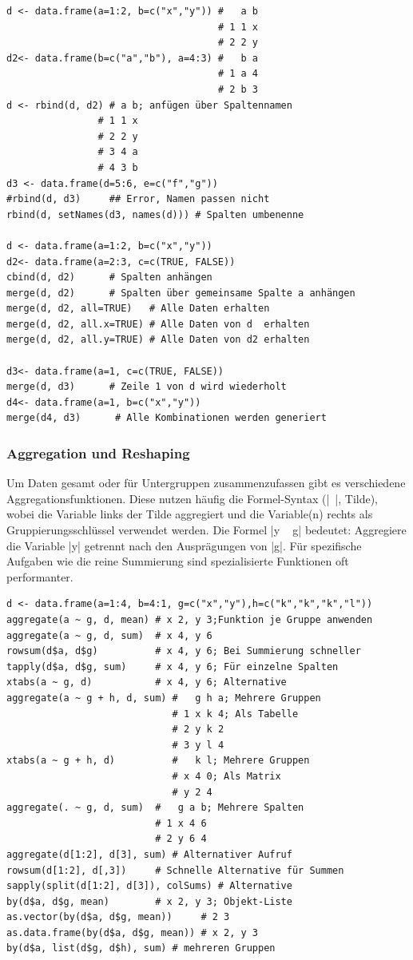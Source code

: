 \documentclass[10pt,twocolumn]{scrartcl}
\renewcommand{\lstinline}{\mycoloredinline}
\begin{document}
\begin{lstlisting}
d <- data.frame(a=1:2, b=c("x","y")) #   a b
                                     # 1 1 x
                                     # 2 2 y
d2<- data.frame(b=c("a","b"), a=4:3) #   b a
                                     # 1 a 4
                                     # 2 b 3
d <- rbind(d, d2) # a b; anfügen über Spaltennamen
                # 1 1 x
                # 2 2 y
                # 3 4 a
                # 4 3 b
d3 <- data.frame(d=5:6, e=c("f","g"))
#rbind(d, d3)     ## Error, Namen passen nicht
rbind(d, setNames(d3, names(d))) # Spalten umbenenne

d <- data.frame(a=1:2, b=c("x","y"))
d2<- data.frame(a=2:3, c=c(TRUE, FALSE))
cbind(d, d2)      # Spalten anhängen
merge(d, d2)      # Spalten über gemeinsame Spalte a anhängen
merge(d, d2, all=TRUE)   # Alle Daten erhalten
merge(d, d2, all.x=TRUE) # Alle Daten von d  erhalten
merge(d, d2, all.y=TRUE) # Alle Daten von d2 erhalten

d3<- data.frame(a=1, c=c(TRUE, FALSE))
merge(d, d3)      # Zeile 1 von d wird wiederholt
d4<- data.frame(a=1, b=c("x","y"))
merge(d4, d3)      # Alle Kombinationen werden generiert
\end{lstlisting}


\subsubsection{Aggregation und Reshaping}

Um Daten gesamt oder für Untergruppen zusammenzufassen gibt es verschiedene Aggregationsfunktionen. Diese nutzen häufig die Formel-Syntax (\lstinline|~|, Tilde), wobei die Variable links der Tilde aggregiert und die Variable(n) rechts als Gruppierungsschlüssel verwendet werden. Die Formel \lstinline|y ~ g| bedeutet: Aggregiere die Variable \lstinline|y| getrennt nach den Ausprägungen von \lstinline|g|. Für spezifische Aufgaben wie die reine Summierung sind spezialisierte Funktionen oft performanter.

\begin{lstlisting}
d <- data.frame(a=1:4, b=4:1, g=c("x","y"),h=c("k","k","k","l"))
aggregate(a ~ g, d, mean) # x 2, y 3;Funktion je Gruppe anwenden
aggregate(a ~ g, d, sum)  # x 4, y 6
rowsum(d$a, d$g)          # x 4, y 6; Bei Summierung schneller
tapply(d$a, d$g, sum)     # x 4, y 6; Für einzelne Spalten
xtabs(a ~ g, d)           # x 4, y 6; Alternative
aggregate(a ~ g + h, d, sum) #   g h a; Mehrere Gruppen
                             # 1 x k 4; Als Tabelle
                             # 2 y k 2
                             # 3 y l 4
xtabs(a ~ g + h, d)          #   k l; Mehrere Gruppen
                             # x 4 0; Als Matrix
                             # y 2 4
aggregate(. ~ g, d, sum)  #   g a b; Mehrere Spalten
                          # 1 x 4 6
                          # 2 y 6 4
aggregate(d[1:2], d[3], sum) # Alternativer Aufruf
rowsum(d[1:2], d[,3])     # Schnelle Alternative für Summen
sapply(split(d[1:2], d[3]), colSums) # Alternative
by(d$a, d$g, mean)        # x 2, y 3; Objekt-Liste
as.vector(by(d$a, d$g, mean))     # 2 3
as.data.frame(by(d$a, d$g, mean)) # x 2, y 3
by(d$a, list(d$g, d$h), sum) # mehreren Gruppen
\end{lstlisting}
\end{document}
